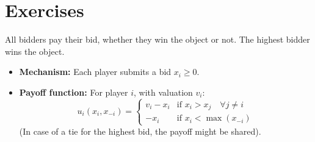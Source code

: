 \section{Exercises}

\begin{exemple}
All bidders pay their bid, whether they win the object or not. The highest bidder wins the object.
\begin{itemize}
    \item \textbf{Mechanism:} Each player submits a bid $x_i \ge 0$.
    \item \textbf{Payoff function:} For player $i$, with valuation $v_i$:
    \[ u_i(x_i, x_{-i}) = \begin{cases} v_i - x_i & \text{if } x_i > x_j \quad \forall j \neq i \\ -x_i & \text{if } x_i < \max(x_{-i}) \end{cases} \]
    (In case of a tie for the highest bid, the payoff might be shared).
\end{itemize}
\end{exemple}

